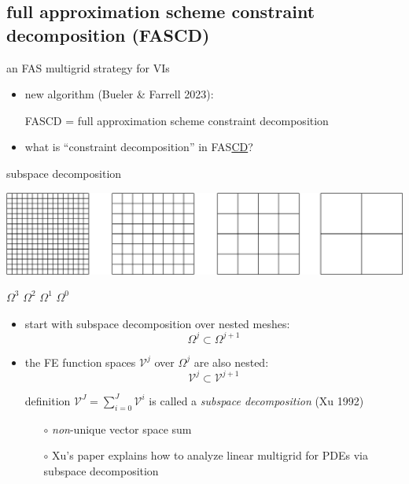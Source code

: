 \documentclass[svgnames,
               hyperref={colorlinks,citecolor=DeepPink4,linkcolor=FireBrick,urlcolor=Maroon},
               usepdftitle=false]  %
               {beamer}
\newcommand{\ds}{\displaystyle}
\begin{document}
\subsection{full approximation scheme constraint decomposition (FASCD)}

\begin{frame}{an FAS multigrid strategy for VIs}

\begin{itemize}
\item new algorithm (Bueler \& Farrell 2023):

{\color{FireBrick} FASCD = full approximation scheme constraint decomposition}

\bigskip
\item what is ``constraint decomposition'' in FAS\underline{CD}?
\end{itemize}
\end{frame}

\newcommand{\cK}{\mathcal{K}}

\begin{frame}{subspace decomposition}

\hfill \includegraphics[height=0.12\textheight]{../talk-oxford/images/mg-grids.png}

{\footnotesize
\hfill $\Omega^3$ \hspace{8.5mm} $\Omega^2$ \hspace{8.5mm} $\Omega^1$ \hspace{8.5mm} $\Omega^0$ \hspace{1mm}
}

\begin{itemize}
\item start with subspace decomposition over nested meshes:
    $$\Omega^j \subset \Omega^{j+1}$$
\item the FE function spaces $\mathcal{V}^j$ over $\Omega^j$ are also nested:
    $$\mathcal{V}^j \subset \mathcal{V}^{j+1}$$

\begin{block}{definition}
$\ds \mathcal{V}^J = \sum_{i=0}^J \mathcal{V}^i$ \quad is called a \emph{subspace decomposition} (Xu 1992)
\end{block}
    \begin{itemize}
    \item[$\circ$] \emph{non}-unique vector space sum
    \item[$\circ$] Xu's paper explains how to analyze linear multigrid for PDEs via subspace decomposition
    \end{itemize}
\end{itemize}
\end{frame}
\end{document}
